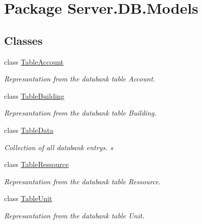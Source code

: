 \hypertarget{namespaceServer_1_1DB_1_1Models}{\section{Package Server.\-D\-B.\-Models}
\label{namespaceServer_1_1DB_1_1Models}
}
\subsection*{Classes}
\begin{DoxyCompactItemize}
\item 
class \hyperlink{classServer_1_1DB_1_1Models_1_1TableAccount}{Table\-Account}
\begin{DoxyCompactList}\small\item\em Represantation from the databank table Account. \end{DoxyCompactList}\item 
class \hyperlink{classServer_1_1DB_1_1Models_1_1TableBuilding}{Table\-Building}
\begin{DoxyCompactList}\small\item\em Represantation from the databank table Building. \end{DoxyCompactList}\item 
class \hyperlink{classServer_1_1DB_1_1Models_1_1TableData}{Table\-Data}
\begin{DoxyCompactList}\small\item\em Collection of all databank entrys. s \end{DoxyCompactList}\item 
class \hyperlink{classServer_1_1DB_1_1Models_1_1TableRessource}{Table\-Ressource}
\begin{DoxyCompactList}\small\item\em Represantation from the databank table Ressource. \end{DoxyCompactList}\item 
class \hyperlink{classServer_1_1DB_1_1Models_1_1TableUnit}{Table\-Unit}
\begin{DoxyCompactList}\small\item\em Represantation from the databank table Unit. \end{DoxyCompactList}\end{DoxyCompactItemize}

